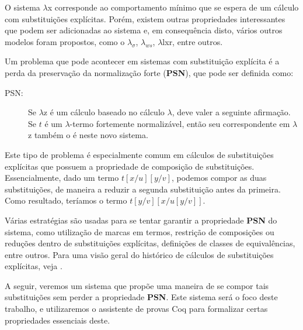 O sistema $\lambda$x corresponde ao comportamento mínimo que se espera de um
cálculo com substituições explícitas. Porém, existem outras propriedades
interessantes que podem ser adicionadas ao sistema e, em consequência disto,
vários outros modelos foram propostos, como o $\lambda_\sigma$, $\lambda_{ws}$,
$\lambda$lxr, entre outros. 

Um problema que pode acontecer em sistemas com substituição explícita é a perda
da preservação da normalização forte (\textbf{PSN}), que pode ser definida como:

\begin{description}
    \item[PSN:] Se $\lambda$z é um cálculo baseado no cálculo $\lambda$, deve
        valer a seguinte afirmação. Se $t$ é um $\lambda$-termo fortemente
        normalizável, então seu correspondente em $\lambda$z também o é neste
        novo sistema.
\end{description}

Este tipo de problema é especialmente comum em cálculos de substituições
explícitas que possuem a propriedade de composição de substituições.
Essencialmente, dado um termo $t[x/u][y/v]$, podemos compor as duas
substituições, de maneira a reduzir a segunda substituição antes da primeira.
Como resultado, teríamos o termo $t[y/v][x/u[y/v]]$. 

Várias estratégias são usadas para se tentar garantir a propriedade \textbf{PSN}
do sistema, como utilização de marcas em termos, restrição de composições ou
reduções dentro de substituições explícitas, definições de classes de
equivalências, entre outros. Para uma visão geral do histórico de cálculos de
substituições explícitas, veja \cite{es_overview}.

A seguir, veremos um sistema que propõe uma maneira de se compor tais
substituições sem perder a propriedade \textbf{PSN}. Este sistema será o foco
deste trabalho, e utilizaremos o assistente de provas Coq para formalizar certas
propriedades essenciais deste.




